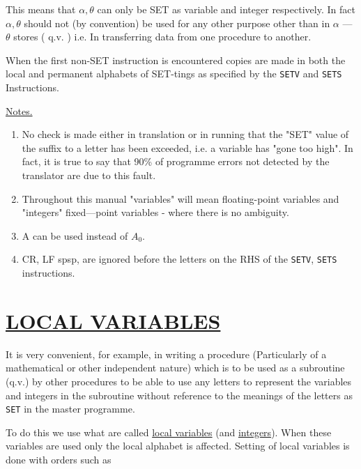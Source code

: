 \documentclass[10pt, a4paper, oneside]{article}
\newcommand{\myuline}[1]{\uline{#1}}
\newcommand{\mytt}[1]{\texttt{\scriptsize #1}}
\newcommand{\mytt}[1]{\texttt{\small #1}}
\begin{document}
\begin{multicols}{2}
This means that $\alpha,\theta$ can only be SET as variable
and integer respectively. In fact $\alpha,\theta$ should not
(by convention) be used for any other purpose other
than in $\alpha$ — $\theta$ stores ( q.v. ) i.e. In transferring
data from one procedure to another.

When the first non-SET instruction is encountered
copies are made in both the local and permanent
alphabets of SET-tings as specified by
the \mytt{SETV} and \mytt{SETS} Instructions.


\begin{flushleft}
\myuline{Notes.}
\end{flushleft}

\renewcommand{\labelenumi}{(\roman{enumi})}
\begin{enumerate}

\item No check is made either in translation or in
running that the "SET" value of the suffix to a letter
has been exceeded, i.e. a variable has "gone too high".
In fact, it is true to say that 90\% of programme errors
not detected by the translator are due to this fault.

\item Throughout this manual "variables" will mean
floating-point variables and "integers" fixed—point
variables - where there is no ambiguity.

\item A can be used instead of $A_{0}$.

\item CR, LF spsp, are ignored before the letters on
the RHS of the \mytt{SETV}, \mytt{SETS} instructions.

\end{enumerate}

\section{\myuline{LOCAL VARIABLES}}

It is very convenient, for example, in writing
a procedure (Particularly of a mathematical or other
independent nature) which is to be used as a
subroutine (q.v.) by other procedures to be able to
use any letters to represent the variables and
integers in the subroutine without reference to
the meanings of the letters as \mytt{SET} in the master
programme.

To do this we use what are called \myuline{local variables}
(and \myuline{integers}).  When these variables are used
only the local alphabet is affected.  Setting of local
variables is done with orders such as


\end{multicols}
\end{document}

